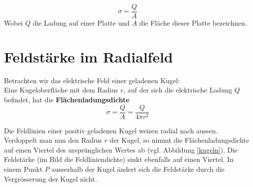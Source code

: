 \documentclass[11pt,twoside=false,open=any]{scrbook}
\begin{document}
\begin{equation}
\sigma = \frac{Q}{A}
\label{sigmadef}
\end{equation}
Wobei $Q$ die Ladung auf einer Platte und $A$ die Fläche dieser Platte bezeichnen.
\begin{center}
   \setlength{\fboxrule}{2pt}
\end{center}

\section{Feldstärke im Radialfeld}

Betrachten wir das elektrische Feld einer geladenen Kugel:\\
Eine Kugeloberfläche mit dem Radius $r$, auf der sich die elektrische Ladung $Q$ befindet, hat die \textbf{Flächenladungsdichte}
\begin{equation}
\sigma = \frac{Q}{A} = \frac{Q}{4 \pi r^{2}}
\label{sigmakugel}
\end{equation}

Die Feldlinien einer positiv geladenen Kugel weisen radial nach aussen. Verdoppelt man nun den Radius $r$ der Kugel, so nimmt die Flächenladungsdichte auf einen Viertel des ursprünglichen Wertes ab (vgl. Abbildung \ref{kugeln}). Die Feldstärke (im Bild die Feldliniendichte) sinkt ebenfalls auf einen Viertel. In einem Punkt $P$ ausserhalb der Kugel ändert sich die Feldstärke durch die Vergrösserung der Kugel nicht.
\end{document}

